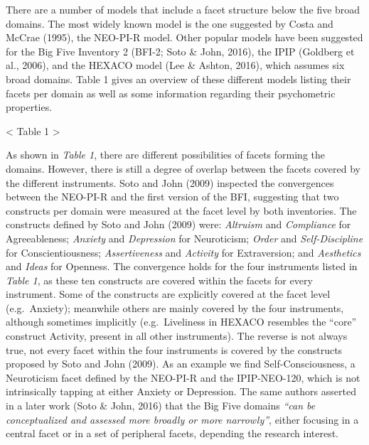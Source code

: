 \documentclass[,man]{apa6}
\theoremstyle{definition}
\theoremstyle{definition}
\theoremstyle{definition}
\theoremstyle{remark}
\begin{document}
There are a number of models that include a facet structure below the
five broad domains. The most widely known model is the one suggested by
Costa and McCrae (1995), the NEO-PI-R model. Other popular models have
been suggested for the Big Five Inventory 2 (BFI-2; Soto \& John, 2016),
the IPIP (Goldberg et al., 2006), and the HEXACO model (Lee \& Ashton,
2016), which assumes six broad domains. Table 1 gives an overview of
these different models listing their facets per domain as well as some
information regarding their psychometric properties.

\vspace{5mm}

\textless{} Table 1 \textgreater{}

\vspace{5mm}

As shown in \emph{Table 1}, there are different possibilities of facets
forming the domains. However, there is still a degree of overlap between
the facets covered by the different instruments. Soto and John (2009)
inspected the convergences between the NEO-PI-R and the first version of
the BFI, suggesting that two constructs per domain were measured at the
facet level by both inventories. The constructs defined by Soto and John
(2009) were: \emph{Altruism} and \emph{Compliance} for Agreeableness;
\emph{Anxiety} and \emph{Depression} for Neuroticism; \emph{Order} and
\emph{Self-Discipline} for Conscientiousness; \emph{Assertiveness} and
\emph{Activity} for Extraversion; and \emph{Aesthetics} and \emph{Ideas}
for Openness. The convergence holds for the four instruments listed in
\emph{Table 1}, as these ten constructs are covered within the facets
for every instrument. Some of the constructs are explicitly covered at
the facet level (e.g.~Anxiety); meanwhile others are mainly covered by
the four instruments, although sometimes implicitly (e.g.~Liveliness in
HEXACO resembles the \enquote{core} construct Activity, present in all
other instruments). The reverse is not always true, not every facet
within the four instruments is covered by the constructs proposed by
Soto and John (2009). As an example we find Self-Consciousness, a
Neuroticism facet defined by the NEO-PI-R and the IPIP-NEO-120, which is
not intrinsically tapping at either Anxiety or Depression. The same
authors asserted in a later work (Soto \& John, 2016) that the Big Five
domains \emph{\enquote{can be conceptualized and assessed more broadly
or more narrowly}}, either focusing in a central facet or in a set of
peripheral facets, depending the research interest.
\end{document}
